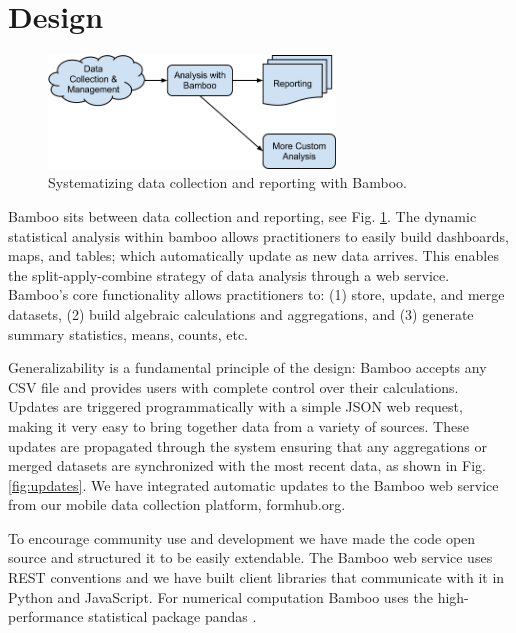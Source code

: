 \documentclass{acm_proc_article-sp}
\begin{document}
\section{Design}

\begin{figure}
\centering
\includegraphics[width=3in]{figures/bamboo_flow}
\caption{Systematizing data collection and reporting with Bamboo.}
\label{fig:flow}
\end{figure}

Bamboo sits between data collection and reporting, see Fig. \ref{fig:flow}. The
dynamic statistical analysis within bamboo allows practitioners to easily build
dashboards, maps, and tables; which automatically update as new data
arrives.  This enables the split-apply-combine strategy of data analysis
\cite{wickham} through a web service.  
Bamboo's core functionality allows
practitioners to: (1) store, update, and merge datasets, (2) build algebraic calculations and aggregations, and (3) generate summary statistics, means, counts, etc.

Generalizability is a fundamental principle of the design: Bamboo accepts any
CSV file and provides users with complete control over their calculations.
Updates are triggered programmatically with a simple JSON web request, making it
very easy to bring together data from a variety of sources.
These updates are propagated through the system ensuring that any aggregations or merged datasets are synchronized with the most recent data, as shown in Fig. \ref{fig:updates}.  
We have integrated automatic updates to the Bamboo web service from our mobile data collection platform, formhub.org.

To encourage community use and development we have made the code open source and structured it to be easily extendable. The Bamboo web service uses REST conventions and we have built client libraries that communicate with it in Python and JavaScript.  For numerical computation Bamboo uses the high-performance statistical package pandas \cite{mckinney}.
\end{document}
